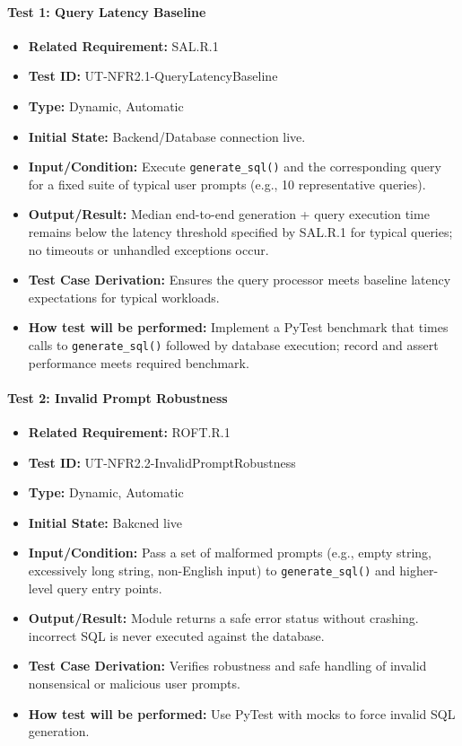 \documentclass[12pt, titlepage]{article}
\begin{document}
\begin{flushleft}
\paragraph{Test 1: Query Latency Baseline}
\begin{itemize}
    \item \textbf{Related Requirement:} SAL.R.1
    \item \textbf{Test ID:} UT-NFR2.1-QueryLatencyBaseline
    \item \textbf{Type:} Dynamic, Automatic
    \item \textbf{Initial State:} Backend/Database connection live.
    \item \textbf{Input/Condition:} Execute \texttt{generate\_sql()} and the corresponding query for a fixed suite of typical user prompts (e.g., 10 representative queries).
    \item \textbf{Output/Result:} Median end-to-end generation + query execution time remains below the latency threshold specified by SAL.R.1 for typical queries; no timeouts or unhandled exceptions occur.
    \item \textbf{Test Case Derivation:} Ensures the query processor meets baseline latency expectations for typical workloads.
    \item \textbf{How test will be performed:} Implement a PyTest benchmark that times calls to \texttt{generate\_sql()} followed by database execution; record and assert performance meets required benchmark.
\end{itemize}

\paragraph{Test 2: Invalid Prompt Robustness}
\begin{itemize}
    \item \textbf{Related Requirement:} ROFT.R.1
    \item \textbf{Test ID:} UT-NFR2.2-InvalidPromptRobustness
    \item \textbf{Type:} Dynamic, Automatic
    \item \textbf{Initial State:} Bakcned live
    \item \textbf{Input/Condition:} Pass a set of malformed prompts (e.g., empty string, excessively long string, non-English input) to \texttt{generate\_sql()} and higher-level query entry points.
    \item \textbf{Output/Result:} Module returns a safe error status without crashing. incorrect SQL is never executed against the database.
    \item \textbf{Test Case Derivation:} Verifies robustness and safe handling of invalid nonsensical or malicious user prompts.
    \item \textbf{How test will be performed:} Use PyTest with mocks to force invalid SQL generation.
\end{itemize}


\end{flushleft}
\end{document}
